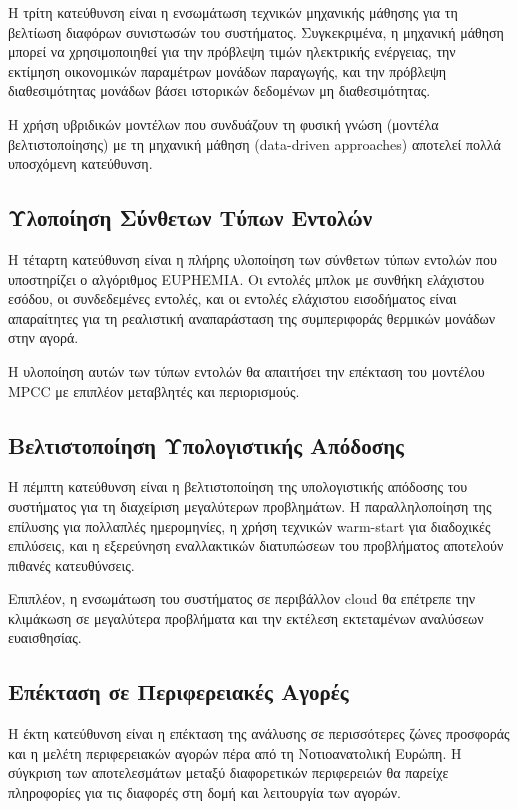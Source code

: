 Η τρίτη κατεύθυνση είναι η ενσωμάτωση τεχνικών μηχανικής μάθησης για τη βελτίωση διαφόρων συνιστωσών του συστήματος. Συγκεκριμένα, η μηχανική μάθηση μπορεί να χρησιμοποιηθεί για την πρόβλεψη τιμών ηλεκτρικής ενέργειας, την εκτίμηση οικονομικών παραμέτρων μονάδων παραγωγής, και την πρόβλεψη διαθεσιμότητας μονάδων βάσει ιστορικών δεδομένων μη διαθεσιμότητας.

Η χρήση υβριδικών μοντέλων που συνδυάζουν τη φυσική γνώση (μοντέλα βελτιστοποίησης) με τη μηχανική μάθηση (data-driven approaches) αποτελεί πολλά υποσχόμενη κατεύθυνση.

\subsection{Υλοποίηση Σύνθετων Τύπων Εντολών}
\label{subsec:complex-orders}

Η τέταρτη κατεύθυνση είναι η πλήρης υλοποίηση των σύνθετων τύπων εντολών που υποστηρίζει ο αλγόριθμος EUPHEMIA. Οι εντολές μπλοκ με συνθήκη ελάχιστου εσόδου, οι συνδεδεμένες εντολές, και οι εντολές ελάχιστου εισοδήματος είναι απαραίτητες για τη ρεαλιστική αναπαράσταση της συμπεριφοράς θερμικών μονάδων στην αγορά.

Η υλοποίηση αυτών των τύπων εντολών θα απαιτήσει την επέκταση του μοντέλου MPCC με επιπλέον μεταβλητές και περιορισμούς.

\subsection{Βελτιστοποίηση Υπολογιστικής Απόδοσης}
\label{subsec:performance-optimization}

Η πέμπτη κατεύθυνση είναι η βελτιστοποίηση της υπολογιστικής απόδοσης του συστήματος για τη διαχείριση μεγαλύτερων προβλημάτων. Η παραλληλοποίηση της επίλυσης για πολλαπλές ημερομηνίες, η χρήση τεχνικών warm-start για διαδοχικές επιλύσεις, και η εξερεύνηση εναλλακτικών διατυπώσεων του προβλήματος αποτελούν πιθανές κατευθύνσεις.

Επιπλέον, η ενσωμάτωση του συστήματος σε περιβάλλον cloud θα επέτρεπε την κλιμάκωση σε μεγαλύτερα προβλήματα και την εκτέλεση εκτεταμένων αναλύσεων ευαισθησίας.

\subsection{Επέκταση σε Περιφερειακές Αγορές}
\label{subsec:regional-extension}

Η έκτη κατεύθυνση είναι η επέκταση της ανάλυσης σε περισσότερες ζώνες προσφοράς και η μελέτη περιφερειακών αγορών πέρα από τη Νοτιοανατολική Ευρώπη. Η σύγκριση των αποτελεσμάτων μεταξύ διαφορετικών περιφερειών θα παρείχε πληροφορίες για τις διαφορές στη δομή και λειτουργία των αγορών.

